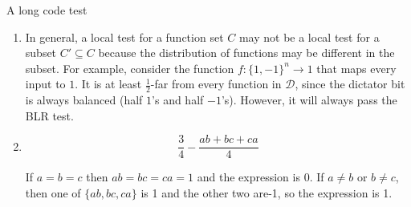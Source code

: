 \documentclass[12pt]{article}
\makeatletter
\renewcommand{\section}{\@startsection{section}{1}{0mm}
   {\baselineskip}%
   {\baselineskip}{\normalfont\normalsize}}%
\makeatother
\begin{document}






\setcounter{section}{6}
\section{A long code test}

\begin{enumerate}

\item
In general, a local test for a function set $C$ may not be a local test for
a subset $C' \subseteq C$ because the distribution of functions may be
different in the subset. For example, consider
the function $f: \{1,-1\}^n \rightarrow {1}$ that maps every input to $1$.
It is at least $\frac{1}{2}$-far from every function in $\mathcal{D}$, since
the dictator bit is always balanced (half $1$'s and half $-1$'s). However,
it will always pass the BLR test.

\item
\begin{displaymath}
\frac{3}{4} - \frac{ab + bc + ca}{4}
\end{displaymath}

If $a = b = c$ then $ab = bc = ca = 1$ and the expression is 0.
If $a \ne b$ or $b \ne c$, then one of $\{ab,bc,ca\}$ is 1 and the other two are-1, so the expression is 1.

\end{enumerate}






\end{document}
